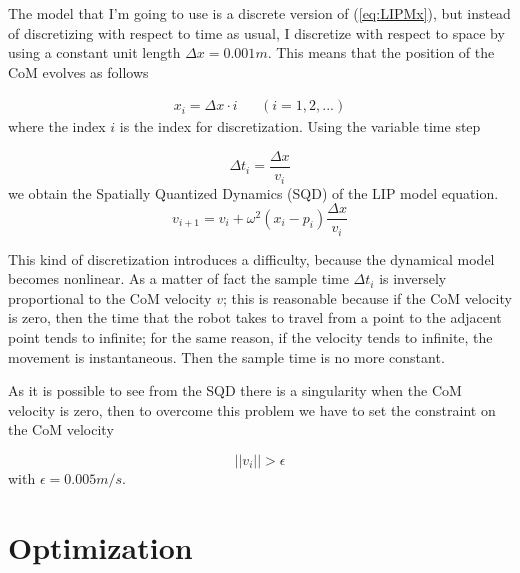 \documentclass[a4paper]{article}
\begin{document}
The model that I'm  going to use is a discrete version of (\ref{eq:LIPMx}), but instead of discretizing with respect to time as usual, I discretize with respect to space by using a constant unit length $\Delta x=0.001m$. This means that the position of the CoM evolves as follows  

\begin{equation}
\begin{aligned}
x_i = \Delta x \cdot i  && (i=1,2,...)
\end{aligned}
\label{eq:com_evolution}
\end{equation}
where the index $i$ is the index for discretization. Using the variable time step 

\begin{equation}
\Delta t_i = \frac{\Delta x}{v_i}
\label{eq:sampletime}
\end{equation}
 we obtain the Spatially Quantized Dynamics (SQD) of the LIP model equation.
\begin{equation}
v_{i+1} = v_i+\omega^2(x_i-p_i)\frac{\Delta x}{v_i}
\label{eq:SQD}
\end{equation}

This kind of discretization introduces a difficulty, because the dynamical model becomes nonlinear. As a matter of fact the sample time $\Delta t_i$ is inversely proportional to the CoM velocity $v$; this is reasonable because if the CoM velocity is zero, then the time that the robot takes to travel from a point to the adjacent point tends to infinite; for the same reason, if the velocity tends to infinite, the movement is instantaneous. Then the sample time is no more constant.

As it is possible to see from the SQD there is a singularity when the CoM velocity is zero, then to overcome this problem we have to set the constraint on the CoM velocity 

\begin{equation}
||v_i||>\epsilon
\label{eq:vel_const}
\end{equation}
with $\epsilon=0.005m/s$.
\section{Optimization}
\end{document}
